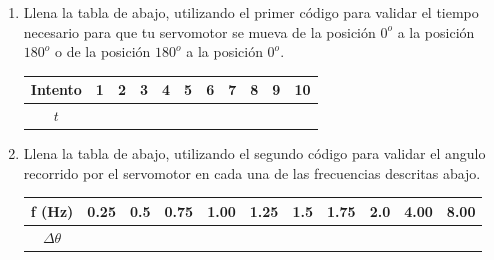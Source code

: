 	\begin{enumerate}
		\item Llena la tabla de abajo, utilizando el primer código para validar el tiempo necesario para que tu servomotor se mueva de la posición $0^o$ a la posición $180^o$ o de la posición $180^o$ a la posición $0^o$.

		\begin{center}
			\begin{tabular}{|c|c|c|c|c|c|c|c|c|c|c|}
				 \hline
				 Intento & 1 & 2 & 3 & 4 & 5 & 6 & 7 & 8 & 9 & 10 \\
				 \hline
				 $t$ &\hspace{0.6cm} &\hspace{0.6cm} &\hspace{0.6cm} &\hspace{0.6cm} &\hspace{0.6cm} &\hspace{0.6cm} &\hspace{0.6cm} &\hspace{0.6cm} &\hspace{0.6cm} &\hspace{0.6cm} \\
				 \hline
			\end{tabular}
		\end{center}

		\item Llena la tabla de abajo, utilizando el segundo código para validar el angulo recorrido por el servomotor en cada una de las frecuencias descritas abajo.

		\begin{center}
			\begin{tabular}{|c|c|c|c|c|c|c|c|c|c|c|}
				 \hline
				 f (Hz) & 0.25 & 0.5 & 0.75 & 1.00 & 1.25 & 1.5 & 1.75 & 2.0 & 4.00 & 8.00 \\
				 \hline
				 $\Delta\theta$ &\hspace{0.6cm} &\hspace{0.6cm} &\hspace{0.6cm} &\hspace{0.6cm} &\hspace{0.6cm} &\hspace{0.6cm} &\hspace{0.6cm} &\hspace{0.6cm} &\hspace{0.6cm} &\hspace{0.6cm} \\
				 \hline
			\end{tabular}
		\end{center}


\end{enumerate}
